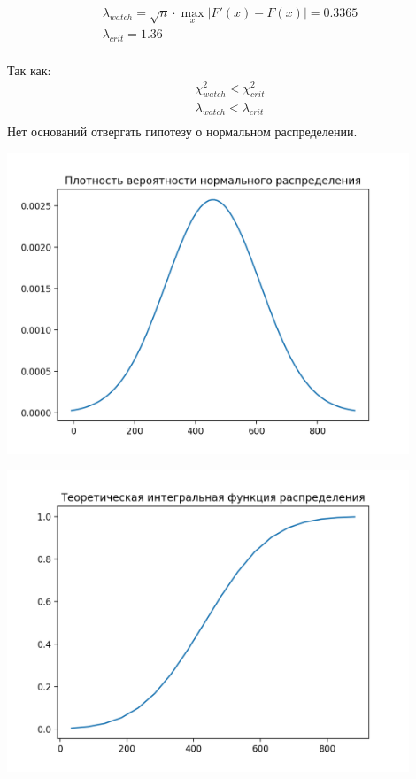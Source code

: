 \begin{gather*}
    \lambda_{watch} = \sqrt{n}\cdot\max_{x}\left| F{}'(x) - F(x) \right| = 0.3365\\
    \lambda_{crit} = 1.36\\
\end{gather*}

Так как:
\begin{gather*}
    \chi^2_{watch} < \chi^2_{crit}\\
    \lambda_{watch} < \lambda_{crit}\\
\end{gather*}
Нет оснований отвергать гипотезу о нормальном распределении.

\includegraphics[width=0.9\textwidth]{src/gr21}

\includegraphics[width=0.9\textwidth]{src/gr22}
